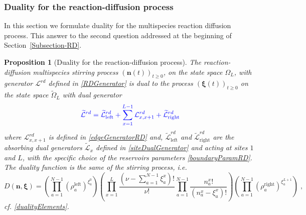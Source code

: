 \documentclass[10pt]{article}
\numberwithin{equation}{section}
\numberwithin{equation}{subsection}
\newtheorem{proposition}{Proposition}
\newcommand{\co}{\;,}
\newcommand{\fra}[1]{\textcolor[rgb]{0,0,1}{#1}}
\begin{document}
{\subsubsection{Duality for the reaction-diffusion process}
In this section we formulate duality for the multispecies reaction diffusion process. This answer to the second question addressed at the beginning of Section~\ref{Subsection-RD}.
\begin{proposition}[Duality for the reaction-diffusion process]\label{propositin-duality-RD}
The reaction-diffusion multispecies stirring process $(\bm{n}(t))_{t\geq 0}$, on the state space $\Omega_{L}$, with generator $\mathcal{L}^{rd}$ defined in \eqref{RDGenerator} is dual to the process $(\bm{\xi}(t))_{t\geq 0}$ on the state space $\widetilde{\Omega}_{L}$ with dual generator
\begin{equation}\label{DualGeneratorRD}
	\fra{\widetilde{\mathcal{L}}^{rd}=\widetilde{\mathcal{L}}_{\text{left}}^{rd}+\sum_{x=1}^{L-1}\mathcal{L}_{x,x+1}^{rd}+\widetilde{\mathcal{L}}_{\text{right}}^{rd}}
\end{equation}
where 
$\mathcal{L}_{x,x+1}^{rd}$ is defined in \eqref{edgeGeneratorRD} and, $\widetilde{\mathcal{L}}_{\text{left}}^{rd}$ and $\widetilde{\mathcal{L}}_{\text{right}}^{rd}$ are the absorbing dual generators $\widetilde{\mathcal{L}}_{x}$ defined in \eqref{siteDualGenerator} and acting at sites $1$ and $L$, with the specific choice of the reservoirs parameters \eqref{boundaryParamRD}. The duality function
is the same of the stirring process, i.e.
\begin{equation}
	D(\bm{n},\bm{\xi})=\left(\prod_{a=1}^{N-1}\left(\rho_{a}^{\text{left}}\right)^{\xi_{a}^{0}}\right)\left(\prod_{x=1}^{L}\frac{(\nu -\sum_{a=1}^{N-1}\xi_{a}^{x})!}{\nu!}\prod_{a=1}^{N-1}\frac{n_{a}^{x}!}{(n_{a}^{x}-\xi_{a}^{x})!}\right)\left(\prod_{a=1}^{N-1}\left(\rho_{a}^{\text{right}}\right)^{\xi_{a}^{L+1}}\right)\co
\end{equation}
cf. \eqref{dualityElements}.
\end{proposition} 

}
\end{document}
